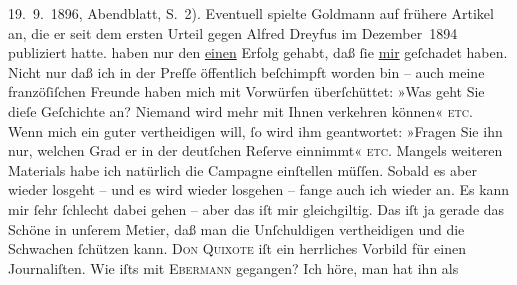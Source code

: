 \begin{ledgroupsized}[t]{13cm}
{{{                        19. 9. 1896, Abendblatt, S. 2). Eventuell spielte Goldmann auf frühere Artikel an, die er seit
                  dem ersten Urteil gegen Alfred Dreyfus im
                     Dezember 1894 publiziert hatte.}}}\label{K_L02786-4h} haben nur
               den \uline{einen} Erfolg gehabt, daß ſie \uline{mir} geſchadet haben. Nicht nur daß ich in der Preſſe öffentlich
               beſchimpft worden bin – auch meine franzöſiſchen Freunde haben mich mit Vorwürfen überſchüttet: »Was geht Sie
               dieſe Geſchichte an? Niemand wird mehr mit Ihnen verkehren können« \textsc{etc.} Wenn mich ein guter {\pb}\label{K_L02786-5v}\label{K_L02786-5h} vertheidigen will, ſo wird ihm geantwortet: »Fragen Sie ihn
               nur, welchen Grad er in der deutſchen Reſerve einnimmt« \textsc{etc}. Mangels weiteren
               Materials habe ich natürlich die Campagne einſtellen müſſen. Sobald es aber wieder
               losgeht – und es wird wieder losgehen – fange auch ich wieder an. Es kann mir ſehr
               ſchlecht dabei gehen – aber das iſt  mir
               gleichgiltig. Das iſt ja gerade das Schöne in unſerem Metier, daß {\pb}man die Unſchuldigen vertheidigen und die Schwachen
               ſchützen kann. \textsc{Don Quixote} iſt ein herrliches Vorbild für einen 
               Journaliſten.\pend
           \pstart
           Wie iſts mit \textsc{Ebermann} gegangen? Ich höre, man hat ihn als \label{K_L02786-6v}
\end{ledgroupsized}

